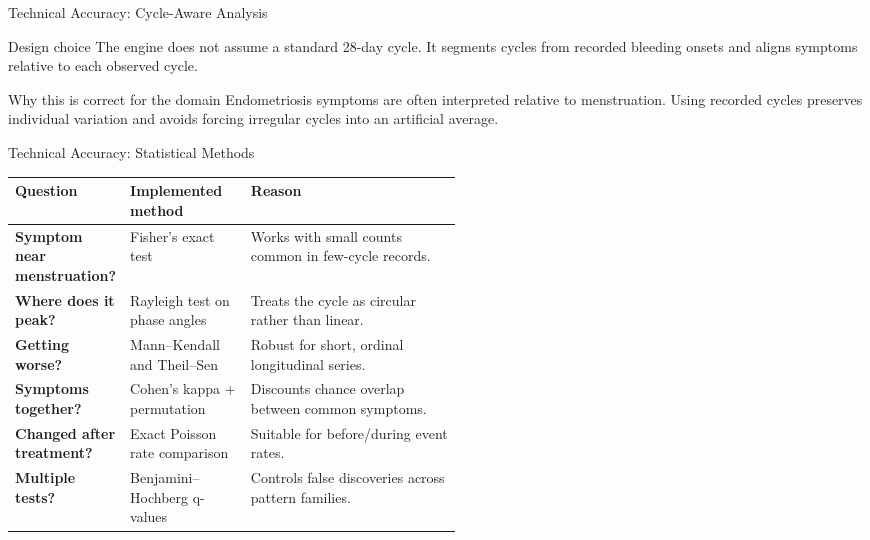 \documentclass[aspectratio=169,11pt]{beamer}
\begin{document}
\begin{frame}{Technical Accuracy: Cycle-Aware Analysis}
  \begin{block}{Design choice}
    The engine does not assume a standard 28-day cycle. It segments cycles from recorded bleeding onsets and aligns symptoms relative to each observed cycle.
  \end{block}

  \begin{center}
  \end{center}

  \begin{block}{Why this is correct for the domain}
    Endometriosis symptoms are often interpreted relative to menstruation. Using recorded cycles preserves individual variation and avoids forcing irregular cycles into an artificial average.
  \end{block}
\end{frame}

\begin{frame}{Technical Accuracy: Statistical Methods}
  \scriptsize
  \begin{tabularx}{\linewidth}{>{\bfseries}p{0.25\linewidth} p{0.27\linewidth} X}
    \toprule
    Question & Implemented method & Reason \\
    \midrule
    Symptom near menstruation? & Fisher's exact test & Works with small counts common in few-cycle records. \\
    Where does it peak? & Rayleigh test on phase angles & Treats the cycle as circular rather than linear. \\
    Getting worse? & Mann--Kendall and Theil--Sen & Robust for short, ordinal longitudinal series. \\
    Symptoms together? & Cohen's kappa + permutation & Discounts chance overlap between common symptoms. \\
    Changed after treatment? & Exact Poisson rate comparison & Suitable for before/during event rates. \\
    Multiple tests? & Benjamini--Hochberg q-values & Controls false discoveries across pattern families. \\
    \bottomrule
  \end{tabularx}
\end{frame}
\end{document}
